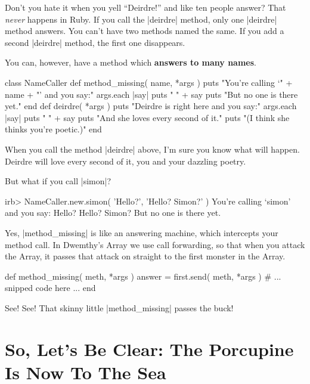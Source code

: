 \documentclass[12pt,twoside]{report}
\begin{document}
Don't you hate it when you yell ``Deirdre!'' and like ten people
answer?  That {\em never} happens in Ruby.  If you call the
\rubyinline|deirdre| method, only one
\rubyinline|deirdre| method answers.  You can't have
two methods named the same.  If you add a second
\rubyinline|deirdre| method, the first one disappears.

You can, however, have a method which {\bf answers to many names}.

\pagebreak

\begin{rubycode}

 class NameCaller
   def method_missing( name, *args )
     puts "You're calling `" + name + "' and you say:"
     args.each { |say| puts "  " + say }
     puts "But no one is there yet."
   end
   def deirdre( *args )
     puts "Deirdre is right here and you say:"
     args.each { |say| puts "  " + say }
     puts "And she loves every second of it."
     puts "(I think she thinks you're poetic.)"
 end

\end{rubycode}


When you call the method \rubyinline|deirdre| above,
I'm sure you know what will happen.  Deirdre will love every second of
it, you and your dazzling poetry.

But what if you call \rubyinline|simon|?


\begin{consolecode}

 irb> NameCaller.new.simon( 'Hello?', 'Hello? Simon?' )
 You're calling `simon' and you say:
   Hello?
   Hello? Simon?
 But no one is there yet.

\end{consolecode}


Yes, \rubyinline|method_missing| is like an answering
machine, which intercepts your method call.  In Dwemthy's Array we use
call forwarding, so that when you attack the Array, it passes that
attack on straight to the first monster in the Array.


\begin{rubycode}

 def method_missing( meth, *args )
   answer = first.send( meth, *args )
   # ... snipped code here ...
 end

\end{rubycode}


See!  See!  That skinny little
\rubyinline|method_missing| passes the buck!


\section{So, Let's Be Clear: The Porcupine Is Now To The Sea}
\end{document}
